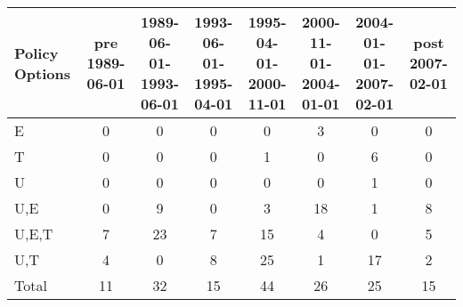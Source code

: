 \begin{tabular}{lccccccc}
\hline\hline 
\addlinespace 
Policy Options & pre 1989-06-01 & \shortstack{1989-06-01- \\ 1993-06-01} & \shortstack{1993-06-01- \\ 1995-04-01} & \shortstack{1995-04-01- \\ 2000-11-01} & \shortstack{2000-11-01- \\ 2004-01-01} & \shortstack{2004-01-01- \\ 2007-02-01} & post 2007-02-01 \\ 
\hline 
E & 0 & 0 & 0 & 0 & 3 & 0 & 0 \\
T & 0 & 0 & 0 & 1 & 0 & 6 & 0 \\
U & 0 & 0 & 0 & 0 & 0 & 1 & 0 \\
U,E & 0 & 9 & 0 & 3 & 18 & 1 & 8 \\
U,E,T & 7 & 23 & 7 & 15 & 4 & 0 & 5 \\
U,T & 4 & 0 & 8 & 25 & 1 & 17 & 2 \\
\addlinespace 
Total & 11 & 32 & 15 & 44 & 26 & 25 & 15 \\
\hline 
\end{tabular}